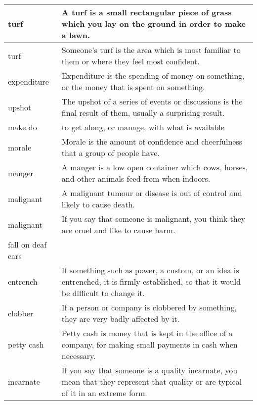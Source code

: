 \documentclass{article}
\begin{document}
\begin{center}
\begin{longtable}{|l|p{9cm}|}
\hline
turf
&
A turf is a small rectangular piece of grass which you lay on the ground in order to make a lawn.
\\

\hline
turf
&
Someone's turf is the area which is most familiar to them or where they feel most confident.
\\

\hline
expenditure
&
Expenditure is the spending of money on something, or the money that is spent on something.
\\

\hline
upshot
&
The upshot of a series of events or discussions is the final result of them, usually a surprising result.
\\


\hline
make do
&
to get along, or manage, with what is available
\\

\hline
morale
&
Morale is the amount of confidence and cheerfulness that a group of people have.
\\

\hline
manger
&
A manger is a low open container which cows, horses, and other animals feed from when indoors.
\\

\hline
malignant
&
A malignant tumour or disease is out of control and likely to cause death.
\\

\hline
malignant
&
If you say that someone is malignant, you think they are cruel and like to cause harm.
\\

\hline
fall on deaf ears
&

\\

\hline
entrench
&
If something such as power, a custom, or an idea is entrenched, it is firmly established, so that it would be difficult to change it.
\\

\hline
clobber
&
If a person or company is clobbered by something, they are very badly affected by it.
\\

\hline
petty cash
&
Petty cash is money that is kept in the office of a company, for making small payments in cash when necessary.
\\

\hline
incarnate
&
If you say that someone is a quality incarnate, you mean that they represent that quality or are typical of it in an extreme form.
\\


\end{longtable}
\end{center}
\end{document}
